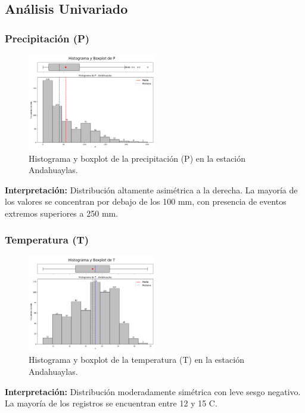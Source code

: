 \subsection{Análisis Univariado}

\subsubsection*{Precipitación (P)}
\begin{figure}[H]
\centering
\includegraphics[width=0.5\textwidth]{resultados/por_estacion_meteorologica/Andahuaylas/P_histograma.png}
\caption{Histograma y boxplot de la precipitación (P) en la estación Andahuaylas.}
\label{fig:andahuaylas_P}
\end{figure}
\textbf{Interpretación:} Distribución altamente asimétrica a la derecha. La mayoría de los valores se concentran por debajo de los 100 mm, con presencia de eventos extremos superiores a 250 mm.

\subsubsection*{Temperatura (T)}
\begin{figure}[H]
\centering
\includegraphics[width=0.5\textwidth]{resultados/por_estacion_meteorologica/Andahuaylas/T_histograma.png}
\caption{Histograma y boxplot de la temperatura (T) en la estación Andahuaylas.}
\label{fig:andahuaylas_T}
\end{figure}
\textbf{Interpretación:} Distribución moderadamente simétrica con leve sesgo negativo. La mayoría de los registros se encuentran entre 12 y 15 \textdegree C.

